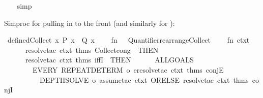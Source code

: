 \begin{isabellebody}
%
\isadelimproof
\ \ %
\endisadelimproof
%
\isatagproof
{}\isamarkupfalse%
\ simp%
\endisatagproof
{\isafoldproof}%
%
\isadelimproof
%
\endisadelimproof
%
\begin{isamarkuptext}%
Simproc for pulling  in 
  to the front (and similarly for ):%
\end{isamarkuptext}\isamarkuptrue%
%
\isadelimML
%
\endisadelimML
%
\isatagML
{}\isamarkupfalse%
\ defined{\isacharunderscore}{\kern0pt}Collect\ {\isacharparenleft}{\kern0pt}{\isachardoublequoteopen}{\isacharbraceleft}{\kern0pt}x{\isachardot}{\kern0pt}\ P\ x\ {\isasymand}\ Q\ x{\isacharbraceright}{\kern0pt}{\isachardoublequoteclose}{\isacharparenright}{\kern0pt}\ {\isacharequal}{\kern0pt}\ {\isacartoucheopen}\isanewline
\ \ fn\ {\isacharunderscore}{\kern0pt}\ {\isacharequal}{\kern0pt}{\isachargreater}{\kern0pt}\ Quantifier{}{\isachardot}{\kern0pt}rearrange{\isacharunderscore}{\kern0pt}Collect\isanewline
\ \ \ \ {\isacharparenleft}{\kern0pt}fn\ ctxt\ {\isacharequal}{\kern0pt}{\isachargreater}{\kern0pt}\isanewline
\ \ \ \ \ \ resolve{\isacharunderscore}{\kern0pt}tac\ ctxt\ {\isacharat}{\kern0pt}{\isacharbraceleft}{\kern0pt}thms\ Collect{\isacharunderscore}{\kern0pt}cong{\isacharbraceright}{\kern0pt}\ {}\ THEN\isanewline
\ \ \ \ \ \ resolve{\isacharunderscore}{\kern0pt}tac\ ctxt\ {\isacharat}{\kern0pt}{\isacharbraceleft}{\kern0pt}thms\ iffI{\isacharbraceright}{\kern0pt}\ {}\ THEN\isanewline
\ \ \ \ \ \ ALLGOALS\isanewline
\ \ \ \ \ \ \ \ {\isacharparenleft}{\kern0pt}EVERY{\isacharprime}{\kern0pt}\ {\isacharbrackleft}{\kern0pt}REPEAT{\isacharunderscore}{\kern0pt}DETERM\ o\ eresolve{\isacharunderscore}{\kern0pt}tac\ ctxt\ {\isacharat}{\kern0pt}{\isacharbraceleft}{\kern0pt}thms\ conjE{\isacharbraceright}{\kern0pt}{\isacharcomma}{\kern0pt}\isanewline
\ \ \ \ \ \ \ \ \ \ DEPTH{\isacharunderscore}{\kern0pt}SOLVE{\isacharunderscore}{\kern0pt}{}\ o\ {\isacharparenleft}{\kern0pt}assume{\isacharunderscore}{\kern0pt}tac\ ctxt\ ORELSE{\isacharprime}{\kern0pt}\ resolve{\isacharunderscore}{\kern0pt}tac\ ctxt\ {\isacharat}{\kern0pt}{\isacharbraceleft}{\kern0pt}thms\ conjI{\isacharbraceright}{\kern0pt}{\isacharparenright}{\kern0pt}{\isacharbrackright}{\kern0pt}{\isacharparenright}{\kern0pt}{\isacharparenright}{\kern0pt}\isanewline

\end{isabellebody}
